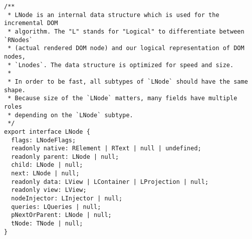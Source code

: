 \begin{verbatim}
/**
 * LNode is an internal data structure which is used for the incremental DOM
 * algorithm. The "L" stands for "Logical" to differentiate between `RNodes`
 * (actual rendered DOM node) and our logical representation of DOM nodes,
 * `Lnodes`. The data structure is optimized for speed and size.
 *
 * In order to be fast, all subtypes of `LNode` should have the same shape.
 * Because size of the `LNode` matters, many fields have multiple roles
 * depending on the `LNode` subtype.
 */
export interface LNode {
  flags: LNodeFlags;
  readonly native: RElement | RText | null | undefined;
  readonly parent: LNode | null;
  child: LNode | null;
  next: LNode | null;
  readonly data: LView | LContainer | LProjection | null;
  readonly view: LView;
  nodeInjector: LInjector | null;
  queries: LQueries | null;
  pNextOrParent: LNode | null;
  tNode: TNode | null;
}
\end{verbatim}
